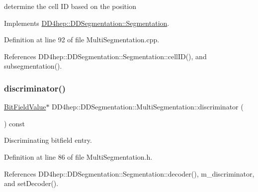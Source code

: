 determine the cell ID based on the position 



Implements \hyperlink{class_d_d4hep_1_1_d_d_segmentation_1_1_segmentation_ad5a60953d96d409850d8192f64f8ce3c}{D\+D4hep\+::\+D\+D\+Segmentation\+::\+Segmentation}.



Definition at line 92 of file Multi\+Segmentation.\+cpp.



References D\+D4hep\+::\+D\+D\+Segmentation\+::\+Segmentation\+::cell\+I\+D(), and subsegmentation().

\hypertarget{class_d_d4hep_1_1_d_d_segmentation_1_1_multi_segmentation_afec54824e5d7d0ec1cb9077b2e215c72}{}\label{class_d_d4hep_1_1_d_d_segmentation_1_1_multi_segmentation_afec54824e5d7d0ec1cb9077b2e215c72} 
\subsubsection{\texorpdfstring{discriminator()}{discriminator()}}
{\footnotesize\ttfamily \hyperlink{class_d_d4hep_1_1_d_d_segmentation_1_1_bit_field_value}{Bit\+Field\+Value}$\ast$ D\+D4hep\+::\+D\+D\+Segmentation\+::\+Multi\+Segmentation\+::discriminator (\begin{DoxyParamCaption}{ }\end{DoxyParamCaption}) const\hspace{0.3cm}{\ttfamily [inline]}}



Discriminating bitfield entry. 



Definition at line 86 of file Multi\+Segmentation.\+h.



References D\+D4hep\+::\+D\+D\+Segmentation\+::\+Segmentation\+::decoder(), m\+\_\+discriminator, and set\+Decoder().

\hypertarget{class_d_d4hep_1_1_d_d_segmentation_1_1_multi_segmentation_a6b12b7c8e81de25c22aafee61b5821eb}{}\label{class_d_d4hep_1_1_d_d_segmentation_1_1_multi_segmentation_a6b12b7c8e81de25c22aafee61b5821eb} 
